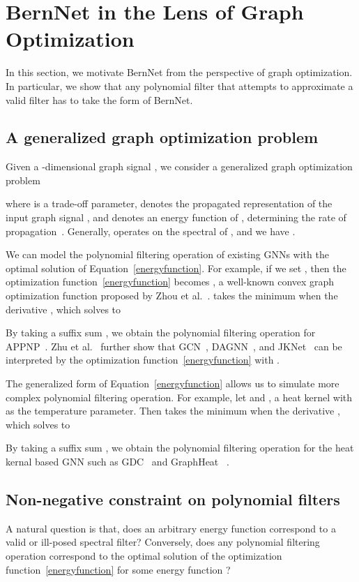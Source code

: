 \documentclass{article}
\begin{document}
\section{BernNet in the Lens of Graph Optimization}
In this section, we motivate BernNet from the perspective of graph optimization. In particular, we show that any polynomial filter that attempts to approximate a valid filter has to take the form of BernNet. 
\subsection{A generalized graph optimization problem}
Given a -dimensional graph signal , we consider a generalized graph optimization problem

where  is a trade-off parameter,  denotes the propagated representation of the input graph signal , and  denotes an energy function of , determining the rate of propagation~\cite{spielman2019spectral}. 
Generally,  operates on the spectral of , and we have .




We can model the polynomial filtering operation of existing GNNs with the optimal solution of Equation~\eqref{energyfunction}. For example, if we set , then the optimization function~\eqref{energyfunction} becomes , a well-known convex graph optimization function proposed by Zhou et al.~\cite{zhouLearing}.   takes the minimum when the derivative ,
which solves to 

By taking a suffix sum , we obtain the polynomial filtering operation for APPNP~\cite{appnp}. Zhu et al.~\cite{zhu2021interpreting} further show that GCN~\cite{kipf2016semi}, DAGNN~\cite{liu2020DAGNN}, and JKNet~\cite{xu2018jknet} can be interpreted by the optimization function~\eqref{energyfunction} with .  





The generalized form of Equation~\eqref{energyfunction} allows us to simulate more complex polynomial filtering operation. For example, let  and , a heat kernel with  as the temperature parameter. Then  takes the minimum when the derivative ,
which solves to 

By taking a suffix sum , we obtain the polynomial filtering operation for the heat kernal based GNN such as GDC~\cite{klicpera2019diffusion} and GraphHeat ~\cite{xu2020graphheat}.

\subsection{Non-negative constraint on polynomial filters}
A natural question is that, does an arbitrary energy function  correspond to a valid or ill-posed spectral filter? Conversely, does any polynomial filtering operation  correspond to the optimal solution of the optimization function~\eqref{energyfunction} for some energy function ? 
\end{document}

